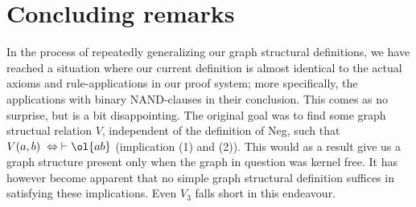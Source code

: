\section{Concluding remarks}
\label{sec:Concluding remarks}
In the process of repeatedly generalizing our graph structural definitions, we have reached a situation where our current definition is almost identical to the actual axioms and rule-applications in our proof system; more specifically, the applications with binary NAND-clauses in their conclusion.
This comes as no surprise, but is a bit disappointing.
The original goal was to find some graph structual relation $V$, independent of the definition of Neg, such that $V(a,b) \; \Leftrightarrow \; \vdash \ol{ab}$ (implication (1) and (2)).
This would as a result give us a graph structure present only when the graph in question was kernel free.
It has however become apparent that no simple graph structural definition suffices in satisfying these implications.
Even $V_3$ falls short in this endeavour.
